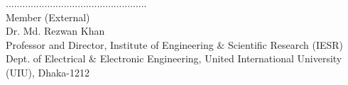 \documentclass[main.tex]{subfiles}
\begin{document}
\vspace{1.8cm}

...................................................\\ 

Member (External)\\ Dr. Md. Rezwan Khan\\ 
Professor and Director, Institute of Engineering $\&$ Scientific Research (IESR)\\
Dept. of Electrical $\&$ Electronic Engineering, United International University (UIU), Dhaka-1212\\



\vspace{2.0cm}

\thispagestyle{fancy}


\end{document}
